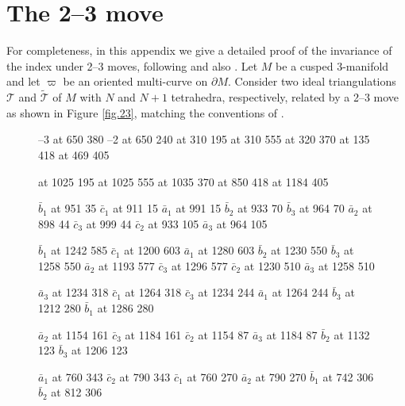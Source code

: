 \documentclass[12pt]{amsart}
\theoremstyle{definition}
\theoremstyle{remark}
\def\lbl{\label}
\newcommand{\CT}{\mathcal{T}}
\newcommand{\wt}{\widetilde}
\def\bd{\partial}
\begin{document}
\appendix

\section{The 2--3 move}
\lbl{app.23}

For completeness, in this appendix we give a detailed proof of the invariance of the index under
2--3 moves, following \cite[Sec.6]{Ga:index} and also \cite{DGG2}.
Let $M$ be a cusped $3$-manifold and let 
$\varpi$ be an oriented 
multi-curve on $\bd M$.
Consider two ideal triangulations $\CT$ and $\wt{\CT}$ of $M$ with $N$ and $N+1$
tetrahedra, respectively, related by a 2--3 move as shown in Figure \ref{fig.23},
matching the conventions of \cite[Sec.3.6]{DG}. 

\begin{figure}[htpb]
\centering

\large
{}--3 at 650 380
--2 at 650 240
\normalsize
{} at 310 195
 at 310 555
 at 320 370
 at 135 418
 at 469 405

 at 1025 195
 at 1025 555
 at 1035 370
 at 850 418
 at 1184 405

\tiny
\pinlabel $\bar b_1$ at 951 35
\pinlabel $\bar c_1$ at 911 15
\pinlabel $\bar a_1$ at 991 15
\pinlabel $\bar b_2$ at 933 70
\pinlabel $\bar b_3$ at 964 70
\pinlabel $\bar a_2$ at 898 44
\pinlabel $\bar c_3$ at 999 44
\pinlabel $\bar c_2$ at 933 105
\pinlabel $\bar a_3$ at 964 105

\pinlabel $\bar b_1$ at 1242 585
\pinlabel $\bar c_1$ at 1200 603
\pinlabel $\bar a_1$ at 1280 603
\pinlabel $\bar b_2$ at 1230 550
\pinlabel $\bar b_3$ at 1258 550
\pinlabel $\bar a_2$ at 1193 577
\pinlabel $\bar c_3$ at 1296 577
\pinlabel $\bar c_2$ at 1230 510
\pinlabel $\bar a_3$ at 1258 510

\pinlabel $\bar a_3$ at 1234 318
\pinlabel $\bar c_1$ at 1264 318
\pinlabel $\bar c_3$ at 1234 244
\pinlabel $\bar a_1$ at 1264 244
\pinlabel $\bar b_3$ at 1212 280
\pinlabel $\bar b_1$ at 1286 280

\pinlabel $\bar a_2$ at 1154 161
\pinlabel $\bar c_3$ at 1184 161
\pinlabel $\bar c_2$ at 1154 87
\pinlabel $\bar a_3$ at 1184 87
\pinlabel $\bar b_2$ at 1132 123
\pinlabel $\bar b_3$ at 1206 123

\pinlabel $\bar a_1$ at 760 343
\pinlabel $\bar c_2$ at 790 343
\pinlabel $\bar c_1$ at 760 270
\pinlabel $\bar a_2$ at 790 270
\pinlabel $\bar b_1$ at 742 306
\pinlabel $\bar b_2$ at 812 306


\end{figure}
\end{document}
